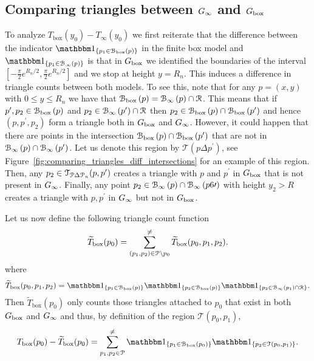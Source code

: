 %

\subsection{Comparing triangles between $G_{\infty}$ and $G_{\text{box}}$}

To analyze $T_{\text{box}}(y_0) - T_\infty(y_0)$ we first reiterate that the difference between the indicator $\ind{p_1 \in \BallPon{p}}$ in the finite box model and $\ind{p_1 \in \BallPo{p}}$ is that in $G_{\text{box}}$ we identified the boundaries of the interval $[-\frac{\pi}{2}e^{R_n/2}, \frac{\pi}{2} e^{R_n/2}]$ and we stop at height $y = R_n$. This induces a difference in triangle counts between both models. 
To see this, note that for any $p = (x,y)$ with $0 \le y \le R_n$ we have that ${\mathcal B}_{\text{box}}\left(p\right) = {\mathcal B}_{\infty}\left(p\right) \cap {\mathcal R}$. This means that if $p^\prime, p_2 \in {\mathcal B}_{\text{box}}\left(p\right)$ and $p_2 \in {\mathcal B}_{\infty}\left(p^\prime\right) \cap {\mathcal R}$ then $p_2 \in {\mathcal B}_{\text{box}}\left(p\right) \cap {\mathcal B}_{\text{box}}\left(p^\prime\right)$ and hence $(p,p^\prime,p_2)$ form a triangle both in $G_{\text{box}}$ and $G_{\infty}$. However, it could happen that there are points in the intersection ${\mathcal B}_{\text{box}}\left(p\right) \cap {\mathcal B}_{\text{box}}\left(p^\prime\right)$ that are not in ${\mathcal B}_{\infty}\left(p\right) \cap {\mathcal B}_{\infty}\left(p^\prime\right)$. Let us denote this region by $\mathcal{T}(p \Delta p^\prime)$, see Figure~\ref{fig:comparing_triangles_diff_intersections} for an example of this region. Then, any $p_2 \in \mathcal{T}_{{\mathcal P} \Delta {\mathcal P}_n}(p,p^\prime)$ creates a triangle with $p$ and $p^\prime$ in $G_{\text{box}}$ that is not present in $G_{\infty}$. Finally, any point $p_2 \in {\mathcal B}_{\infty}\left(p\right) \cap {\mathcal B}_{\infty}\left(p6\prime\right)$ with height $y_2 > R$ creates a triangle with $p, p^\prime$ in $G_{\infty}$ but not in $G_{\text{box}}$.

Let us now define the following triangle count function
\[
	\widetilde{T}_{\text{box}}(p_0) = \sum_{(p_1, p_2) \in {\mathcal P} \setminus p_0}^{\ne} 
		\widetilde{T}_{\text{box}}(p_0,p_1,p_2).
\]
where
\[
	\widetilde{T}_{\text{box}}(p_0,p_1,p_2) = \ind{p_1 \in \BallPon{p}}\ind{p_2 \in \BallPon{p}}\ind{p_2 \in \BallPo{p_1} \cap \Rcal}.
\]
Then $\widetilde{T}_{\text{box}}(p_0)$ only counts those triangles attached to $p_0$ that exist in both $G_{\text{box}}$ and $G_{\infty}$ and thus, by definition of the region $\mathcal{T}(p_0,p_1)$,
\[
	T_{\text{box}}(p_0) - \widetilde{T}_{\text{box}}(p_0)
	= \sum_{p_1, p_2 \in \Pcal }^{\ne} \ind{p_1 \in \BallPon{p_0}} 
			\ind{p_2 \in \mathcal{T}(p_0, p_1)}.
\]

